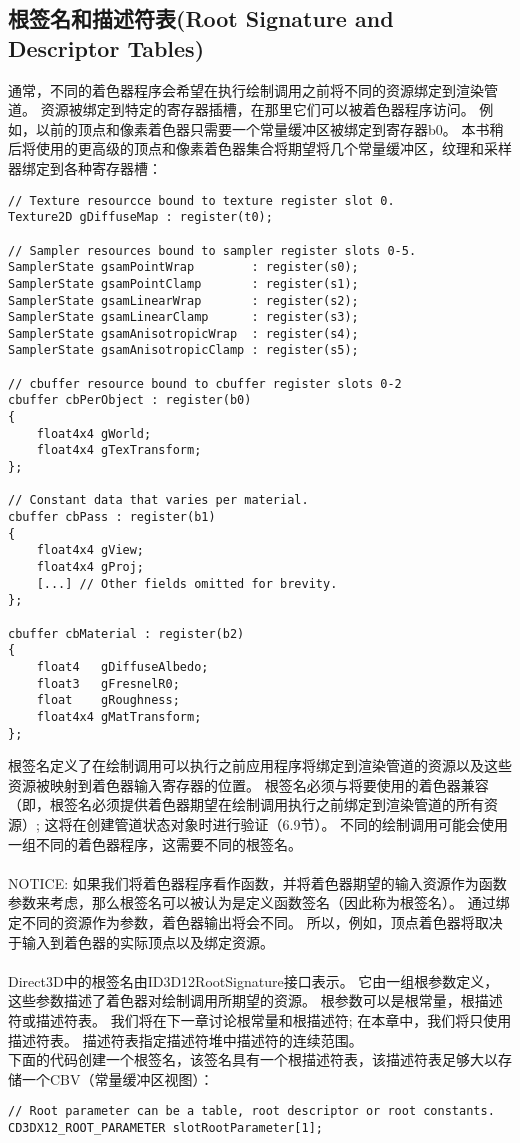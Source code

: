 \subsection{根签名和描述符表(Root Signature and Descriptor Tables)}
\begin{flushleft}
通常，不同的着色器程序会希望在执行绘制调用之前将不同的资源绑定到渲染管道。 资源被绑定到特定的寄存器插槽，在那里它们可以被着色器程序访问。 例如，以前的顶点和像素着色器只需要一个常量缓冲区被绑定到寄存器b0。 本书稍后将使用的更高级的顶点和像素着色器集合将期望将几个常量缓冲区，纹理和采样器绑定到各种寄存器槽：\\
\begin{lstlisting}
// Texture resourcce bound to texture register slot 0.
Texture2D gDiffuseMap : register(t0);

// Sampler resources bound to sampler register slots 0-5.
SamplerState gsamPointWrap        : register(s0);
SamplerState gsamPointClamp       : register(s1);
SamplerState gsamLinearWrap       : register(s2);
SamplerState gsamLinearClamp      : register(s3);
SamplerState gsamAnisotropicWrap  : register(s4);
SamplerState gsamAnisotropicClamp : register(s5);

// cbuffer resource bound to cbuffer register slots 0-2
cbuffer cbPerObject : register(b0)
{
    float4x4 gWorld;
    float4x4 gTexTransform;
};

// Constant data that varies per material.
cbuffer cbPass : register(b1)
{
    float4x4 gView;
    float4x4 gProj;
    [...] // Other fields omitted for brevity.
};

cbuffer cbMaterial : register(b2)
{
    float4   gDiffuseAlbedo;
    float3   gFresnelR0;
    float    gRoughness;
    float4x4 gMatTransform;
};
\end{lstlisting}
根签名定义了在绘制调用可以执行之前应用程序将绑定到渲染管道的资源以及这些资源被映射到着色器输入寄存器的位置。 根签名必须与将要使用的着色器兼容（即，根签名必须提供着色器期望在绘制调用执行之前绑定到渲染管道的所有资源）; 这将在创建管道状态对象时进行验证（6.9节）。 不同的绘制调用可能会使用一组不同的着色器程序，这需要不同的根签名。\\
~\\
NOTICE: 如果我们将着色器程序看作函数，并将着色器期望的输入资源作为函数参数来考虑，那么根签名可以被认为是定义函数签名（因此称为根签名）。 通过绑定不同的资源作为参数，着色器输出将会不同。 所以，例如，顶点着色器将取决于输入到着色器的实际顶点以及绑定资源。\\
~\\
Direct3D中的根签名由ID3D12RootSignature接口表示。 它由一组根参数定义，这些参数描述了着色器对绘制调用所期望的资源。 根参数可以是根常量，根描述符或描述符表。 我们将在下一章讨论根常量和根描述符; 在本章中，我们将只使用描述符表。 描述符表指定描述符堆中描述符的连续范围。\\
下面的代码创建一个根签名，该签名具有一个根描述符表，该描述符表足够大以存储一个CBV（常量缓冲区视图）：\\
\begin{lstlisting}
// Root parameter can be a table, root descriptor or root constants.
CD3DX12_ROOT_PARAMETER slotRootParameter[1];


\end{lstlisting}
\end{flushleft}
